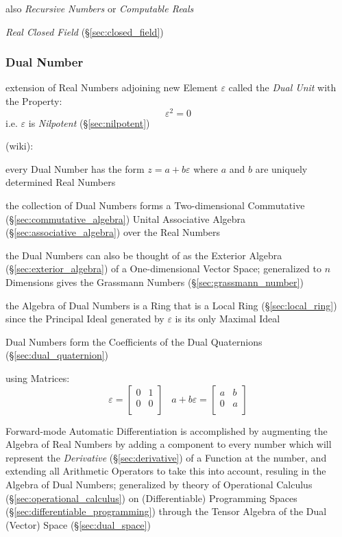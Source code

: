also \emph{Recursive Numbers} or \emph{Computable Reals}

\emph{Real Closed Field} (\S\ref{sec:closed_field})



\subsubsection{Dual Number}\label{sec:dual_number}

extension of Real Numbers adjoining new Element $\varepsilon$ called the
\emph{Dual Unit} with the Property:
\[
  \varepsilon^2 = 0
\]
i.e. $\varepsilon$ is \emph{Nilpotent} (\S\ref{sec:nilpotent})

(wiki):

every Dual Number has the form $z = a + b\varepsilon$ where $a$ and $b$ are
uniquely determined Real Numbers

the collection of Dual Numbers forms a Two-dimensional Commutative
(\S\ref{sec:commutative_algebra}) Unital Associative Algebra
(\S\ref{sec:associative_algebra}) over the Real Numbers

the Dual Numbers can also be thought of as the Exterior Algebra
(\S\ref{sec:exterior_algebra}) of a One-dimensional Vector Space; generalized to
$n$ Dimensions gives the Grassmann Numbers (\S\ref{sec:grassmann_number})

the Algebra of Dual Numbers is a Ring that is a Local Ring
(\S\ref{sec:local_ring}) since the Principal Ideal generated by $\varepsilon$ is
its only Maximal Ideal

Dual Numbers form the Coefficients of the Dual Quaternions
(\S\ref{sec:dual_quaternion})

using Matrices:
\[
  \varepsilon = \begin{bmatrix}
    0 & 1 \\
    0 & 0 \\
  \end{bmatrix}
  \;\;\;
  a + b\varepsilon = \begin{bmatrix}
    a & b \\
    0 & a \\
  \end{bmatrix}
\]

Forward-mode Automatic Differentiation is accomplished by augmenting the Algebra
of Real Numbers by adding a component to every number which will represent the
\emph{Derivative} (\S\ref{sec:derivative}) of a Function at the number, and
extending all Arithmetic Operators to take this into account, resuling in the
Algebra of Dual Numbers; generalized by theory of Operational Calculus
(\S\ref{sec:operational_calculus}) on (Differentiable) Programming Spaces
(\S\ref{sec:differentiable_programming}) through the Tensor Algebra of the Dual
(Vector) Space (\S\ref{sec:dual_space})



